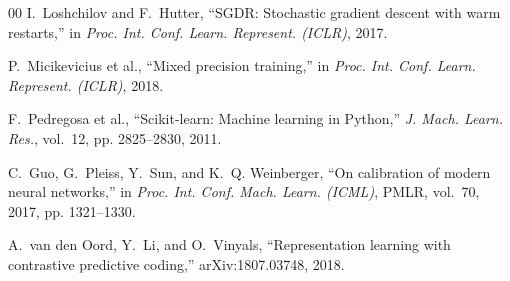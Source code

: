 \documentclass[conference]{IEEEtran}
\begin{document}
\begin{thebibliography}{00}
I.~Loshchilov and F.~Hutter, ``SGDR: Stochastic gradient descent with warm restarts,'' in \emph{Proc. Int. Conf. Learn. Represent. (ICLR)}, 2017.

P.~Micikevicius et al., ``Mixed precision training,'' in \emph{Proc. Int. Conf. Learn. Represent. (ICLR)}, 2018.

F.~Pedregosa et al., ``Scikit-learn: Machine learning in Python,'' \emph{J. Mach. Learn. Res.}, vol.~12, pp. 2825--2830, 2011.

C.~Guo, G.~Pleiss, Y.~Sun, and K.~Q. Weinberger, ``On calibration of modern neural networks,'' in \emph{Proc. Int. Conf. Mach. Learn. (ICML)}, PMLR, vol.~70, 2017, pp. 1321--1330.

A.~van den Oord, Y.~Li, and O.~Vinyals, ``Representation learning with contrastive predictive coding,'' arXiv:1807.03748, 2018.

\end{thebibliography}
\end{document}
